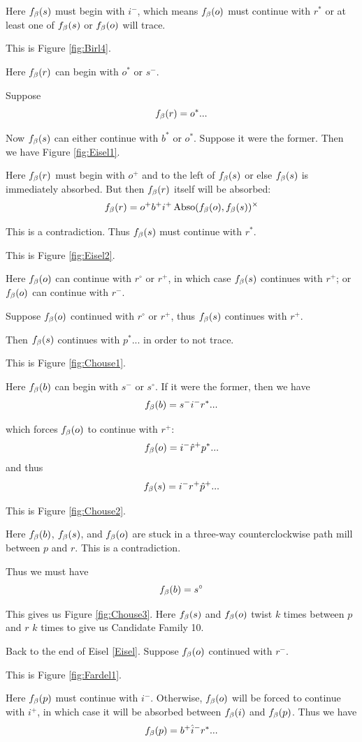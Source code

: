 Here $f_\beta(s)$ must begin with $i^-$, which means $f_\beta(o)$ must continue with $r^*$ or at least one of $f_\beta(s)$ or $f_\beta(o)$ will trace.

This is Figure \ref{fig:Birl4}.

Here $f_\beta(r)$ can begin with $o^*$ or $s^-$. 

\label{Eisel}
Suppose 
$$f_\beta(r) = o^*...$$

Now $f_\beta(s)$ can either continue with $b^*$ or $o^*$. Suppose it were the former. Then we have Figure \ref{fig:Eisel1}.

Here $f_\beta(r)$ must begin with $o^+$ and to the left of $f_\beta(s)$ or else $f_\beta(s)$ is immediately absorbed. But then $f_\beta(r)$ itself will be absorbed:
$$f_\beta(r) = o^+ b^+ i^+ \operatorname{Abso}(f_\beta(o), f_\beta(s))^\times$$

This is a contradiction. Thus $f_\beta(s)$ must continue with $r^*$.

This is Figure \ref{fig:Eisel2}.

Here $f_\beta(o)$ can continue with $r^\circ$ or $r^+$, in which case $f_\beta(s)$ continues with $r^+$; or $f_\beta(o)$ can continue with $r^-$.

\label{Chouse}
Suppose $f_\beta(o)$ continued with $r^\circ$ or $r^+$, thus $f_\beta(s)$ continues with $r^+$.

Then $f_\beta(s)$ continues with $p^*...$ in order to not trace.

This is Figure \ref{fig:Chouse1}.

Here $f_\beta(b)$ can begin with $s^-$ or $s^\circ$. If it were the former, then we have
$$f_\beta(b) = s^- i^- r^*...$$

which forces $f_\beta(o)$ to continue with $r^+$:
$$f_\beta(o) = i^- \hat{r}^+ p^*...$$
and thus
$$f_\beta(s) = i^- r^+ \hat{p}^+...$$

This is Figure \ref{fig:Chouse2}.

Here $f_\beta(b)$, $f_\beta(s)$, and $f_\beta(o)$ are stuck in a three-way counterclockwise path mill between $p$ and $r$. This is a contradiction.

Thus we must have
$$f_\beta(b) = s^\circ$$

This gives us Figure \ref{fig:Chouse3}. Here $f_\beta(s)$ and $f_\beta(o)$ twist $k$ times between $p$ and $r$ $k$ times to give us Candidate Family 10.

\label{Fardel}
Back to the end of Eisel \ref{Eisel}. Suppose $f_\beta(o)$ continued with $r^-$.

This is Figure \ref{fig:Fardel1}.

Here $f_\beta(p)$ must continue with $i^-$. Otherwise, $f_\beta(o)$ will be forced to continue with $i^+$, in which case it will be absorbed between $f_\beta(i)$ and $f_\beta(p)$. Thus we have
$$f_\beta(p) = b^+ \hat{i}^- r^*...$$

